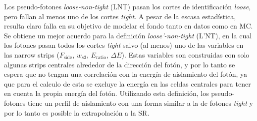 

Los pseudo-fotones \emph{loose-non-tight} (LNT) pasan los cortes de
identificación \emph{loose}, pero fallan al menos uno de los cortes
\emph{tight}. A pesar de la escasa estadística, resulta claro falla en su
objetivo de modelar el fondo tanto en datos como en MC. Se obtiene un mejor
acuerdo para la definición \emph{loose'-non-tight} (L'NT), en la cual los
fotones pasan todos los cortes \emph{tight} salvo (al menos) uno de las
variables en las narrow strips ($F_\text{side}$, $w_{s3}$, $E_\text{ratio}$,
$\Delta E$). Estas variables son construidas con solo algunas strips centrales
alrededor de la dirección del fotón, y por lo tanto se espera que no tengan una
correlación con la energía de aislamiento del fotón, ya que para el calculo de
esta se excluye la energía en las celdas centrales para tener en cuenta la
propia energía del fotón. Utilizando esta definición, los pseudo-fotones tiene
un perfil de aislamiento con una forma similar a la de fotones \emph{tight} y
por lo tanto es posible la extrapolación a la SR.

